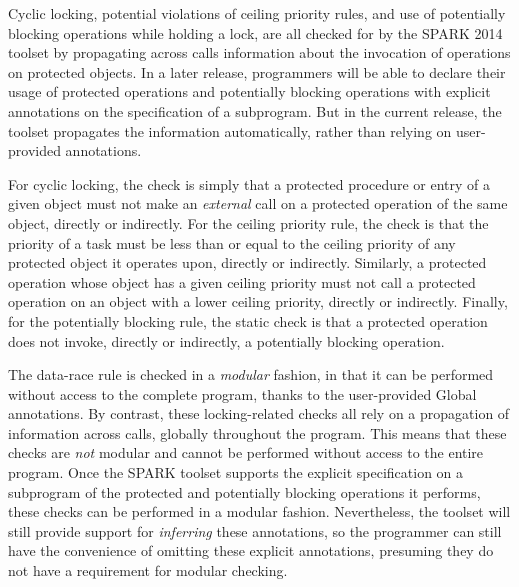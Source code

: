 \documentclass[conference,compsoc]{IEEEtran}
\begin{document}
Cyclic locking, potential violations of ceiling priority rules, and use of
potentially blocking operations while holding a lock, are all checked for
by the SPARK 2014 toolset by propagating across calls information about the
invocation of operations on protected objects. In a later release,
programmers will be able to declare their usage of protected operations and
potentially blocking operations with explicit annotations on the
specification of a subprogram. But in the current release, the toolset
propagates the information automatically, rather than relying on
user-provided annotations.

For cyclic locking, the check is simply that a protected procedure or entry
of a given object must not make an \emph{external} call on a protected
operation of the same object, directly or indirectly. For the ceiling
priority rule, the check is that the priority of a task must be less than
or equal to the ceiling priority of any protected object it operates upon,
directly or indirectly. Similarly, a protected operation whose object has a
given ceiling priority must not call a protected operation on an object
with a lower ceiling priority, directly or indirectly. Finally, for the
potentially blocking rule, the static check is that a protected operation
does not invoke, directly or indirectly, a potentially blocking operation.

The data-race rule is checked in a \emph{modular} fashion, in that it can
be performed without access to the complete program, thanks to the
user-provided Global annotations. By contrast, these locking-related checks
all rely on a propagation of information across calls, globally throughout
the program. This means that these checks are \emph{not} modular and cannot
be performed without access to the entire program. Once the SPARK toolset
supports the explicit specification on a subprogram of the protected and
potentially blocking operations it performs, these checks can be performed
in a modular fashion. Nevertheless, the toolset will still provide support
for \emph{inferring} these annotations, so the programmer can still have
the convenience of omitting these explicit annotations, presuming they do
not have a requirement for modular checking.
\end{document}
